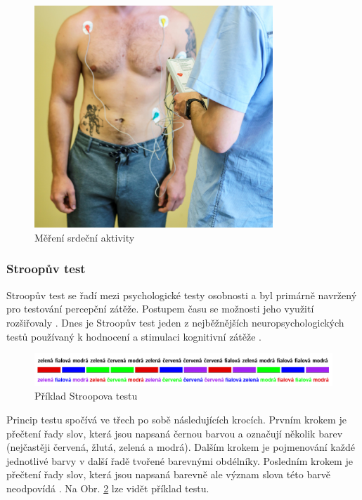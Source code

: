\begin{figure}[h]
    \begin{center}
        \includegraphics[width=0.8\textwidth]{../assets/device/holter2}
        \caption{Měření srdeční aktivity}
        \label{fig:device_usage}
    \end{center}
\end{figure}

\subsubsection{Stroopův test}
\label{section:stroop_test}
Stroopův test se řadí mezi psychologické testy osobnosti a byl primárně navržený
pro testování percepční zátěže. Postupem času se možnosti jeho využití
rozšiřovaly \cite{Svoboda1999}. Dnes je Stroopův test jeden z nejběžnějších
neuropsychologických testů používaný k hodnocení  a stimulaci kognitivní zátěže
\cite{Scarpina2017}.

\begin{figure}[h]
    \begin{center}
        \includegraphics[width=1\textwidth]{../assets/figures/stroop}
        \caption{Příklad Stroopova testu \cite{stroopWiki}}
        \label{fig:stroop}
    \end{center}
\end{figure}

Princip testu spočívá ve třech po sobě následujících krocích. Prvním krokem je
přečtení řady slov, která jsou napsaná černou barvou a označují několik barev
(nejčastěji červená, žlutá, zelená a modrá). Dalším krokem je pojmenování každé
jednotlivé barvy v další řadě tvořené barevnými obdélníky. Posledním krokem je
přečtení řady slov, která jsou napsaná barevně ale význam slova této barvě
neodpovídá \cite{Svoboda1999}. Na Obr. \ref{fig:stroop} lze vidět příklad testu.

